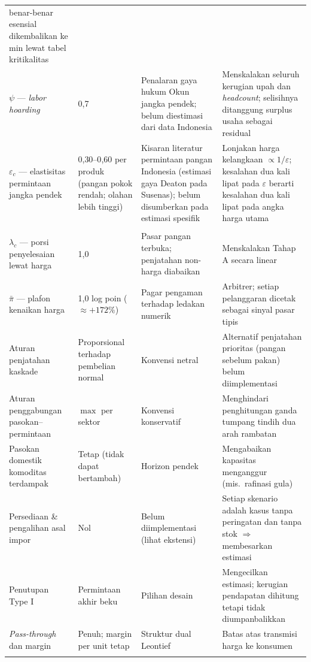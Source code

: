 \documentclass[11pt,a4paper]{article}
\newcommand{\en}[1]{\textit{#1}}   %
\begin{document}
\begin{landscape}
\begin{longtable}{@{}p{3.6cm}p{3.6cm}p{6.5cm}p{7.5cm}@{}}
benar-benar esensial dikembalikan ke min lewat tabel kritikalitas \\
\addlinespace[3pt]
$\psi$ --- \en{labor hoarding} &
0{,}7 &
Penalaran gaya hukum Okun jangka pendek; belum diestimasi dari data
Indonesia &
Menskalakan seluruh kerugian upah dan \en{headcount}; selisihnya
ditanggung surplus usaha sebagai residual \\
\addlinespace[3pt]
$\varepsilon_c$ --- elastisitas permintaan jangka pendek &
0{,}30--0{,}60 per produk (pangan pokok rendah; olahan lebih tinggi) &
Kisaran literatur permintaan pangan Indonesia (estimasi gaya Deaton pada
Susenas); belum disumberkan pada estimasi spesifik &
Lonjakan harga kelangkaan $\propto 1/\varepsilon$; kesalahan dua kali
lipat pada $\varepsilon$ berarti kesalahan dua kali lipat pada angka
harga utama \\
\addlinespace[5pt]
\multicolumn{4}{@{}l}{\emph{Tier 2 --- saklar struktural/perilaku}}\\
\addlinespace[2pt]
$\lambda_c$ --- porsi penyelesaian lewat harga &
1{,}0 &
Pasar pangan terbuka; penjatahan non-harga diabaikan &
Menskalakan Tahap A secara linear \\
$\bar\pi$ --- plafon kenaikan harga &
1{,}0 log poin ($\approx +172\%$) &
Pagar pengaman terhadap ledakan numerik &
Arbitrer; setiap pelanggaran dicetak sebagai sinyal pasar tipis \\
Aturan penjatahan kaskade &
Proporsional terhadap pembelian normal &
Konvensi netral &
Alternatif penjatahan prioritas (pangan sebelum pakan) belum
diimplementasi \\
Aturan penggabungan pasokan--permintaan &
$\max$ per sektor &
Konvensi konservatif &
Menghindari penghitungan ganda tumpang tindih dua arah rambatan \\
Pasokan domestik komoditas terdampak &
Tetap (tidak dapat bertambah) &
Horizon pendek &
Mengabaikan kapasitas menganggur (mis.\ rafinasi gula) \\
Persediaan \& pengalihan asal impor &
Nol &
Belum diimplementasi (lihat ekstensi) &
Setiap skenario adalah kasus tanpa peringatan dan tanpa stok $\Rightarrow$
membesarkan estimasi \\
Penutupan Type I &
Permintaan akhir beku &
Pilihan desain &
Mengecilkan estimasi; kerugian pendapatan dihitung tetapi tidak
diumpanbalikkan \\
\en{Pass-through} dan margin &
Penuh; margin per unit tetap &
Struktur dual Leontief &
Batas atas transmisi harga ke konsumen \\
\addlinespace[5pt]

\end{longtable}
\end{landscape}
\end{document}
